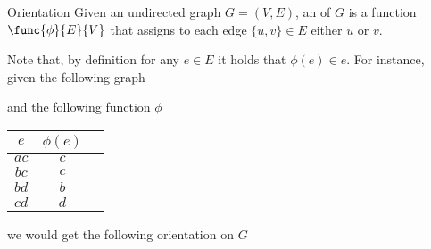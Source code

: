 \documentclass[a4paper, 12pt]{report}
\begin{document}
    \begin{frameddefn}{Orientation}
        Given an undirected graph $G = (V, E)$, an  of $G$ is a function $\func{\phi}{E}{V}$ that assigns to each edge $\{u, v\} \in E$ either $u$ or $v$.
    \end{frameddefn}

    Note that, by definition for any $e \in E$ it holds that $\phi(e) \in e$. For instance, given the following graph

    \begin{figure}[H]
        \centering
    \end{figure}

    and the following function $\phi$

    \begin{center}
        \begin{tabular}{c|c c} 
             \hline
             $e$ & $\phi(e)$ \\
             \hline\hline
             $ac$ & $c$ \\ 
             \hline
             $bc$ & $c$ \\
             \hline
             $bd$ & $b$ \\
             \hline
             $cd$ & $d$ \\
             \hline
        \end{tabular}
    \end{center}

    we would get the following orientation on $G$
\end{document}
